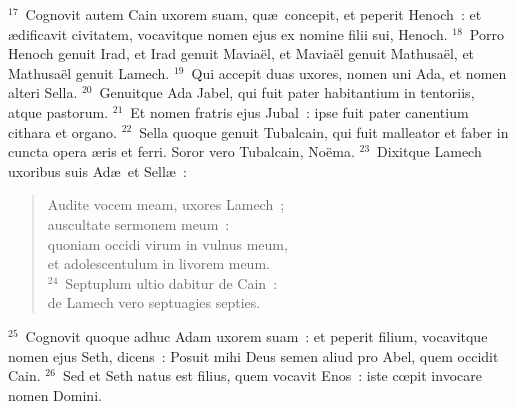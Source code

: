 ${}^{17}$~Cognovit autem Cain uxorem suam, qu\ae\ concepit, et peperit Henoch~: et \ae dificavit civitatem, vocavitque nomen ejus ex nomine filii sui, Henoch.
${}^{18}$~Porro Henoch genuit Irad, et Irad genuit Mavia\"el, et Mavia\"el genuit Mathusa\"el, et Mathusa\"el genuit Lamech.
${}^{19}$~Qui accepit duas uxores, nomen uni Ada, et nomen alteri Sella.
${}^{20}$~Genuitque Ada Jabel, qui fuit pater habitantium in tentoriis, atque pastorum.
${}^{21}$~Et nomen fratris ejus Jubal~: ipse fuit pater canentium cithara et organo.
${}^{22}$~Sella quoque genuit Tubalcain, qui fuit malleator et faber in cuncta opera \ae ris et ferri. Soror vero Tubalcain, No\"ema.
${}^{23}$~Dixitque Lamech uxoribus suis Ad\ae\ et Sell\ae~: \begin{flushleft}\begin{verse}Audite vocem meam, uxores Lamech~;\\ auscultate sermonem meum~:\\ quoniam occidi virum in vulnus meum,\\ et adolescentulum in livorem meum.\\
${}^{24}$~Septuplum ultio dabitur de Cain~:\\ de Lamech vero septuagies septies.\end{verse}\end{flushleft}


${}^{25}$~Cognovit quoque adhuc Adam uxorem suam~: et peperit filium, vocavitque nomen ejus Seth, dicens~: Posuit mihi Deus semen aliud pro Abel, quem occidit Cain.
${}^{26}$~Sed et Seth natus est filius, quem vocavit Enos~: iste cœpit invocare nomen Domini.


